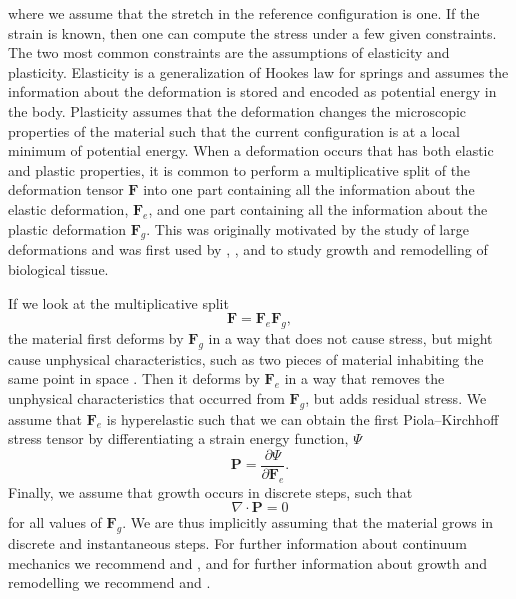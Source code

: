 where we assume that the stretch in the reference configuration is one. If the strain is known, then one can compute the stress under a few given constraints. The two most common constraints are the assumptions of elasticity and plasticity. Elasticity is a generalization of Hookes law for springs and assumes the information about the deformation is stored and encoded as potential energy in the body. Plasticity assumes that the deformation changes the microscopic properties of the material such that the current configuration is at a local minimum of potential energy. When a deformation occurs that has both elastic and plastic properties, it is common to perform a multiplicative split of the deformation tensor $\mathbf{F}$ into one part containing all the information about the elastic deformation, $\mathbf{F}_e$, and one part containing all the information about the plastic deformation $\mathbf{F}_g$. This was originally motivated by the study of large deformations and was first used by \cite{Kondaurov1987}, \cite{Takamizawa1990}, and \cite{Rodriguez1994} to study growth and remodelling of biological tissue. \par 
If we look at the multiplicative split
\begin{equation*}
    \mathbf{F} = \mathbf{F}_e\mathbf{F}_g,
\end{equation*}
the material first deforms by $\mathbf{F}_g$ in a way that does not cause stress, but might cause unphysical characteristics, such as two pieces of material inhabiting the same point in space . Then it deforms by $\mathbf{F}_e$ in a way that removes the unphysical characteristics that occurred from $\mathbf{F}_g$, but adds residual stress. We assume that $\mathbf{F}_e$ is hyperelastic such that we can obtain the first Piola–Kirchhoff stress tensor by differentiating a strain energy function, $\Psi$
\begin{equation*}
    \mathbf{P} = \frac{\partial\Psi}{\partial \mathbf{F}_e}.
\end{equation*}
Finally, we assume that growth occurs in discrete steps, such that 
\begin{equation*}
    \nabla\cdot\mathbf{P} = 0
\end{equation*}
for all values of $\mathbf{F}_g$. We are thus implicitly assuming that the material grows in discrete and instantaneous steps. For further information about continuum mechanics we recommend \cite{Marsden1983} and \cite{Holzapfel2002}, and for further information about growth and remodelling we recommend \cite{Goriely2017} and \cite{Yavari2010}.
